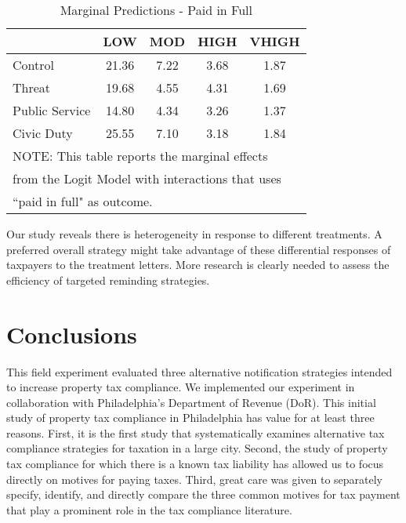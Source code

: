 \documentclass[12pt,titlepage]{article}
\begin{document}
\begin{table}[htbp]
\caption{Marginal Predictions - Paid in Full} 
\label{table:modelI_marg}
\centering
\begin{tabular}{|l|c|c|c|c|}
  \hline
 & LOW & MOD & HIGH & VHIGH \\ 
  \hline
Control & 21.36 & 7.22 & 3.68 & 1.87 \\ 
  Threat & 19.68 & 4.55 & 4.31 & 1.69 \\ 
  Public Service & 14.80 & 4.34 & 3.26 & 1.37 \\ 
  Civic Duty & 25.55 & 7.10 & 3.18 & 1.84 \\ 
   \hline
\multicolumn{5}{l}{NOTE: This table reports the marginal effects} \\
\multicolumn{5}{l}{from the Logit Model with interactions that uses} \\
\multicolumn{5}{l}{``paid in full" as outcome.} \\
\end{tabular}
\end{table}


Our study reveals there is heterogeneity in response to different
treatments.  A preferred overall strategy might take advantage of
these differential responses of taxpayers to the treatment
letters. More research is clearly needed to assess the efficiency of
targeted reminding strategies.


\section{Conclusions}

This field experiment evaluated three alternative notification
strategies intended to increase property tax compliance.  We
implemented our experiment in collaboration with Philadelphia's
Department of Revenue (DoR).  This initial study of property tax
compliance in Philadelphia has value for at least three reasons.
First, it is the first study that systematically examines alternative
tax compliance strategies for taxation in a large city.  Second, the
study of property tax compliance for which there is a known tax
liability has allowed us to focus directly on motives for paying
taxes.  Third, great care was given to separately specify, identify,
and directly compare the three common motives for tax payment that
play a prominent role in the tax compliance literature.
\end{document}
